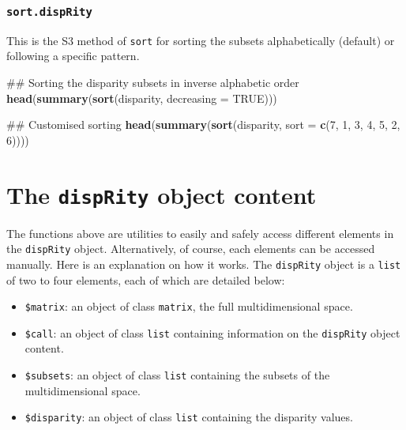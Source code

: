 \documentclass[]{book}
\newenvironment{Shaded}{\begin{snugshade}}{\end{snugshade}}
\newcommand{\KeywordTok}[1]{\textcolor[rgb]{0.13,0.29,0.53}{\textbf{#1}}}
\newcommand{\DataTypeTok}[1]{\textcolor[rgb]{0.13,0.29,0.53}{#1}}
\newcommand{\DecValTok}[1]{\textcolor[rgb]{0.00,0.00,0.81}{#1}}
\newcommand{\OtherTok}[1]{\textcolor[rgb]{0.56,0.35,0.01}{#1}}
\newcommand{\NormalTok}[1]{#1}
\providecommand{\tightlist}{%
  \setlength{\itemsep}{0pt}\setlength{\parskip}{0pt}}
\theoremstyle{definition}
\theoremstyle{definition}
\theoremstyle{remark}
\begin{document}
\subsubsection{\texorpdfstring{\texttt{sort.dispRity}}{sort.dispRity}}\label{sort.disprity}

This is the S3 method of \texttt{sort} for sorting the subsets
alphabetically (default) or following a specific pattern.

\begin{Shaded}
\begin{Highlighting}[]
\NormalTok{## Sorting the disparity subsets in inverse alphabetic order}
\KeywordTok{head}\NormalTok{(}\KeywordTok{summary}\NormalTok{(}\KeywordTok{sort}\NormalTok{(disparity, }\DataTypeTok{decreasing =} \OtherTok{TRUE}\NormalTok{)))}

\NormalTok{## Customised sorting}
\KeywordTok{head}\NormalTok{(}\KeywordTok{summary}\NormalTok{(}\KeywordTok{sort}\NormalTok{(disparity, }\DataTypeTok{sort =} \KeywordTok{c}\NormalTok{(}\DecValTok{7}\NormalTok{, }\DecValTok{1}\NormalTok{, }\DecValTok{3}\NormalTok{, }\DecValTok{4}\NormalTok{, }\DecValTok{5}\NormalTok{, }\DecValTok{2}\NormalTok{, }\DecValTok{6}\NormalTok{))))}
\end{Highlighting}
\end{Shaded}

\section{\texorpdfstring{The \texttt{dispRity} object
content}{The dispRity object content}}\label{the-disprity-object-content}

The functions above are utilities to easily and safely access different
elements in the \texttt{dispRity} object. Alternatively, of course, each
elements can be accessed manually. Here is an explanation on how it
works. The \texttt{dispRity} object is a \texttt{list} of two to four
elements, each of which are detailed below:

\begin{itemize}
\tightlist
\item
  \texttt{\$matrix}: an object of class \texttt{matrix}, the full
  multidimensional space.
\item
  \texttt{\$call}: an object of class \texttt{list} containing
  information on the \texttt{dispRity} object content.
\item
  \texttt{\$subsets}: an object of class \texttt{list} containing the
  subsets of the multidimensional space.
\item
  \texttt{\$disparity}: an object of class \texttt{list} containing the
  disparity values.
\end{itemize}
\end{document}
